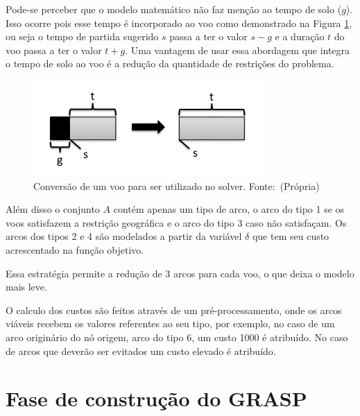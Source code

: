\clearpage

Pode-se perceber que o modelo matemático não faz menção ao tempo de solo ($g$).
Isso ocorre pois esse tempo é incorporado ao voo como demonstrado na Figura
\ref{fig:conversion}, ou seja o tempo de partida sugerido $s$ passa a ter o
valor $s - g$ e a duração $t$ do voo passa a ter o valor $t + g$. Uma vantagem
de usar essa abordagem que integra o tempo de solo ao voo é a redução da
quantidade de restrições do problema.

\begin{figure}[ht]
	\caption{Conversão de um voo para ser utilizado no
	solver. \newline \mbox{Fonte: (Própria)}}\label{fig:conversion}
	\includegraphics[scale=0.4]{./img/conversion}
	
\end{figure}

Além disso o conjunto $A$ contém apenas um tipo de arco, o arco do tipo 1 se os
voos satisfazem a restrição geográfica e o arco do tipo 3 caso não satisfaçam.
Os arcos dos tipos 2 e 4 são modelados a partir  da variável $\delta$ que tem
seu custo acrescentado na função objetivo.

Essa estratégia permite a redução de 3 arcos para cada voo, o que deixa o
modelo mais leve.

O calculo dos custos são feitos através de um pré-processamento, onde os arcos
viáveis recebem os valores referentes ao seu tipo, por exemplo, no caso de um
arco originário do nó origem, arco do tipo 6, um custo 1000 é atribuído. No
caso de arcos que deverão ser evitados um custo elevado é atribuído.
  	
  	

  
\section{Fase de construção do GRASP}
  
